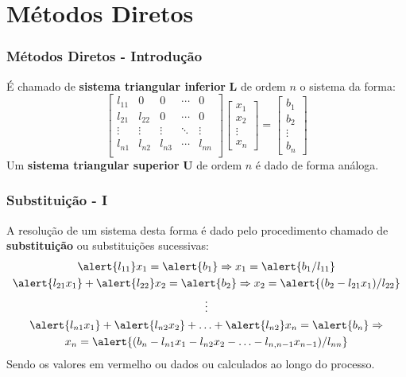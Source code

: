 \documentclass{beamer}
\theoremstyle{mystyle}
\begin{document}
\section{Métodos Diretos}

\begin{frame}
	\frametitle{Métodos Diretos - Introdução}
	É chamado de \textbf{sistema triangular inferior} \textbf{L} de ordem $ n $ o sistema da forma:
	\begin{equation*}
		\left[
		\begin{array}{ccccc}
			l_{11} &   0    &    0   & \cdots & 0 \\
			l_{21} & l_{22} &    0   & \cdots & 0 \\
			\vdots & \vdots & \vdots & \ddots & \vdots \\
			l_{n1} & l_{n2} & l_{n3} & \cdots & l_{nn}\\
		\end{array}
		\right] 
		\begin{bmatrix} x_{1} \\ x_{2} \\ \vdots \\ x_{n} \end{bmatrix}
		=
		\begin{bmatrix} b_{1} \\ b_{2} \\ \vdots \\ b_{n} \end{bmatrix}
	\end{equation*}
	\pause
	Um \textbf{sistema triangular superior} \textbf{U} de ordem $ n $ é dado de forma análoga.
\end{frame}

\begin{frame}
	\frametitle{Substituição - I}
	A resolução de um sistema desta forma é dado pelo procedimento chamado de \textbf{substituição} ou substituições sucessivas:
	\begin{gather*}
		\alert{l_{11}}x_{1} = \alert{b_{1}} \Rightarrow x_{1} = \alert{b_{1}/l_{11}}\\
		\alert{l_{21}x_{1}} + \alert{l_{22}}x_{2} = \alert{b_{2}} \Rightarrow x_{2} = \alert{(b_{2} - l_{21}x_{1})/l_{22}}\\
		\vdots\\
		\alert{l_{n1}x_{1}} + \alert{l_{n2}x_{2}} + \ldots + \alert{l_{n2}}x_{n} = \alert{b_{n}} \Rightarrow\\
		x_{n} = \alert{(b_{n} - l_{n1}x_{1} - l_{n2}x_{2} - \ldots - l_{n,n-1}x_{n-1})/l_{nn}}
	\end{gather*}
	Sendo os valores em vermelho ou dados ou calculados ao longo do processo.
\end{frame}
\end{document}
